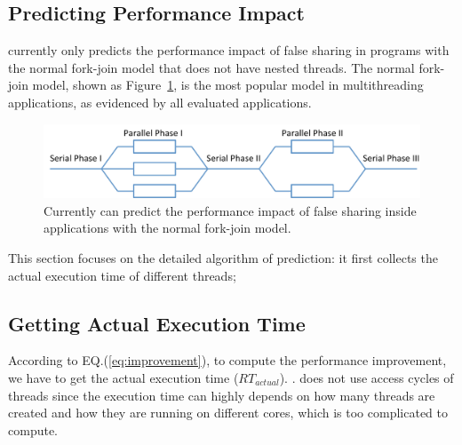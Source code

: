 \subsection{Predicting Performance Impact}

\label{sec:predictimprove}

\Cheetah{} currently only predicts the performance impact of false sharing in programs with the normal fork-join model that does not have nested threads. The normal fork-join model, shown as Figure~\ref{fig:forkjoinmodel}, is the most popular model in multithreading applications, as evidenced by all evaluated applications. 

\begin{figure}[ht!]
\begin{center}
\includegraphics[width=6.5in]{figure/forkjoin}
\end{center}
\caption{Currently \Cheetah{} can predict the performance impact of false sharing inside applications with the normal fork-join model.
\label{fig:forkjoinmodel}}
\end{figure}


This section focuses on the detailed algorithm of prediction: it first collects the actual execution time of different threads;  

\subsection{Getting Actual Execution Time}
\label{sec:getactualtime}

According to EQ.(\ref{eq:improvement}), to compute the performance improvement, we have to get the actual execution time ($RT_{actual}$). 
.  \cheetah{} does not use access cycles of threads since the execution time can highly depends on how many threads are created and how they are running on different cores, which is too complicated to compute.  

